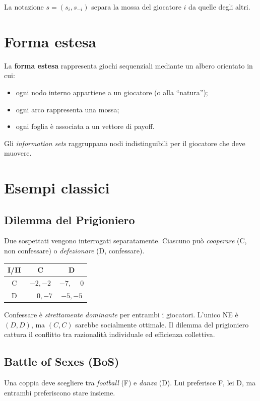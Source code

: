 \documentclass[12pt,a4paper,twoside]{book}
\theoremstyle{plain}
\theoremstyle{definition}
\begin{document}
La notazione $s = (s_i, s_{-i})$ separa la mossa del giocatore $i$ da quelle degli altri.

\section{Forma estesa}

La \textbf{forma estesa} rappresenta giochi sequenziali mediante un albero orientato in cui:
\begin{itemize}
  \item ogni nodo interno appartiene a un giocatore (o alla ``natura'');
  \item ogni arco rappresenta una mossa;
  \item ogni foglia è associata a un vettore di payoff.
\end{itemize}
Gli \emph{information sets} raggruppano nodi indistinguibili per il giocatore che deve muovere.

\section{Esempi classici}

\subsection{Dilemma del Prigioniero}

Due sospettati vengono interrogati separatamente. Ciascuno può \emph{cooperare} (C, non confessare) o \emph{defezionare} (D, confessare).

\begin{center}
\begin{tabular}{c|cc}
I/II & C & D \\\hline
C & $-2,-2$ & $-7,\phantom{-}0$ \\
D & $\phantom{-}0,-7$ & $-5,-5$
\end{tabular}
\end{center}

Confessare è \emph{strettamente dominante} per entrambi i giocatori. L'unico NE è $(D,D)$, ma $(C,C)$ sarebbe socialmente ottimale. Il dilemma del prigioniero cattura il conflitto tra razionalità individuale ed efficienza collettiva.

\subsection{Battle of Sexes (BoS)}

Una coppia deve scegliere tra \emph{football} (F) e \emph{danza} (D). Lui preferisce F, lei D, ma entrambi preferiscono stare insieme.
\end{document}
